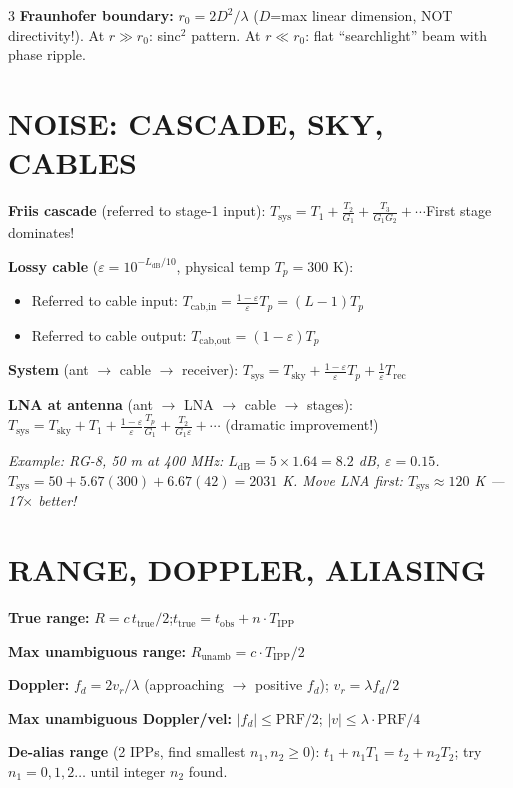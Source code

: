 \documentclass[6pt,landscape]{article}
\begin{document}
\begin{multicols}{3}
\textbf{Fraunhofer boundary:} $r_0=2D^2/\lambda$ ($D$=max linear dimension, NOT directivity!). At $r\gg r_0$: sinc$^2$ pattern. At $r\ll r_0$: flat ``searchlight'' beam with phase ripple.

\section*{NOISE: CASCADE, SKY, CABLES}
\textbf{Friis cascade} (referred to stage-1 input):
$T_\text{sys}=T_1+\frac{T_2}{G_1}+\frac{T_3}{G_1 G_2}+\cdots$\quad First stage dominates!

\textbf{Lossy cable} ($\varepsilon=10^{-L_\text{dB}/10}$, physical temp $T_p=300$ K):
\begin{itemize}
\item Referred to cable input: $T_\text{cab,in}=\frac{1-\varepsilon}{\varepsilon}T_p=(L-1)T_p$
\item Referred to cable output: $T_\text{cab,out}=(1-\varepsilon)T_p$
\end{itemize}

\textbf{System} (ant $\to$ cable $\to$ receiver):
$T_\text{sys}=T_\text{sky}+\frac{1-\varepsilon}{\varepsilon}T_p+\frac{1}{\varepsilon}T_\text{rec}$

\textbf{LNA at antenna} (ant $\to$ LNA $\to$ cable $\to$ stages):
$T_\text{sys}=T_\text{sky}+T_1+\frac{1-\varepsilon}{\varepsilon}\frac{T_p}{G_1}+\frac{T_2}{G_1\varepsilon}+\cdots$ (dramatic improvement!)

\textit{Example: RG-8, 50 m at 400 MHz: $L_\text{dB}=5\times1.64=8.2$ dB, $\varepsilon=0.15$. $T_\text{sys}=50+5.67(300)+6.67(42)=2031$ K. Move LNA first: $T_\text{sys}\approx120$ K — 17$\times$ better!}

\section*{RANGE, DOPPLER, ALIASING}
\textbf{True range:} $R=c\,t_\text{true}/2$;\quad $t_\text{true}=t_\text{obs}+n\cdot T_\text{IPP}$

\textbf{Max unambiguous range:} $R_\text{unamb}=c\cdot T_\text{IPP}/2$

\textbf{Doppler:} $f_d=2v_r/\lambda$ (approaching $\to$ positive $f_d$); $v_r=\lambda f_d/2$

\textbf{Max unambiguous Doppler/vel:} $|f_d|\leq\text{PRF}/2$; $|v|\leq\lambda\cdot\text{PRF}/4$

\textbf{De-alias range} (2 IPPs, find smallest $n_1,n_2\geq0$):
$t_1+n_1 T_1=t_2+n_2 T_2$; try $n_1=0,1,2\ldots$ until integer $n_2$ found.


\end{multicols}
\end{document}

